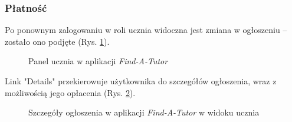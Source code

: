 \documentclass[12pt]{article}
\numberwithin{figure}{section}
\begin{document}
\begin{sloppypar}
\subsubsection{Płatność}
Po ponownym zalogowaniu w roli ucznia widoczna jest zmiana w ogłoszeniu -- zostało ono podjęte (Rys. \ref{fig:student-assigned}).
\begin{figure}[!htbp] 
    \centering
    \caption{Panel ucznia w aplikacji \textit{Find-A-Tutor}}
    \label{fig:student-assigned}
\end{figure}

Link "Details" przekierowuje użytkownika do szczegółów ogłoszenia, wraz z możliwością jego opłacenia (Rys. \ref{fig:details}). 
\begin{figure}[!htbp] 
    \centering
    \caption{Szczegóły ogłoszenia w aplikacji \textit{Find-A-Tutor} w widoku ucznia}
    \label{fig:details}
\end{figure}


\end{sloppypar}
\end{document}
